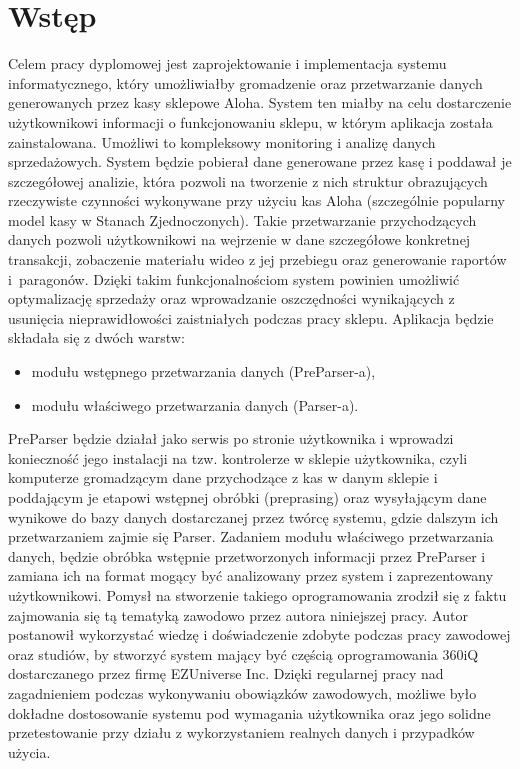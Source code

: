 \documentclass[a4paper]{book}
\author{Mateusz Stolecki}
\begin{document}

\cleardoublepage

	



\mainmatter
\chapter{Wstęp}
\label{rozdzial1}
Celem pracy dyplomowej jest zaprojektowanie i implementacja systemu informatycznego, który umożliwiałby gromadzenie oraz przetwarzanie danych generowanych przez kasy sklepowe Aloha. System ten miałby na  celu dostarczenie użytkownikowi informacji o funkcjonowaniu sklepu, w którym aplikacja została zainstalowana. Umożliwi to kompleksowy monitoring i analizę danych sprzedażowych. System będzie pobierał dane generowane przez kasę i poddawał je szczegółowej analizie, która pozwoli na tworzenie z nich struktur  obrazujących rzeczywiste czynności wykonywane przy użyciu kas Aloha (szczególnie popularny model kasy w Stanach Zjednoczonych). Takie przetwarzanie przychodzących danych pozwoli użytkownikowi na wejrzenie w dane szczegółowe konkretnej transakcji, zobaczenie materiału wideo z jej przebiegu oraz generowanie raportów i~paragonów. Dzięki takim funkcjonalnościom system powinien umożliwić optymalizację sprzedaży oraz wprowadzanie oszczędności wynikających z usunięcia nieprawidłowości zaistniałych podczas pracy sklepu. Aplikacja będzie składała się z dwóch warstw:
\begin{itemize}
	\item modułu wstępnego przetwarzania danych (PreParser-a),
	\item modułu właściwego przetwarzania danych (Parser-a).
\end{itemize}
PreParser będzie działał jako serwis po stronie użytkownika i wprowadzi konieczność jego instalacji na tzw. kontrolerze w sklepie użytkownika, czyli komputerze gromadzącym dane przychodzące z kas w danym sklepie i poddającym je etapowi wstępnej obróbki (preprasing) oraz wysyłającym dane wynikowe do bazy danych dostarczanej przez twórcę systemu, gdzie dalszym ich przetwarzaniem zajmie się Parser. Zadaniem modułu właściwego przetwarzania danych, będzie obróbka wstępnie przetworzonych informacji przez PreParser i zamiana ich na format mogący być analizowany przez system i zaprezentowany użytkownikowi. Pomysł na stworzenie takiego oprogramowania zrodził się z faktu zajmowania się tą tematyką zawodowo przez autora niniejszej pracy. Autor postanowił wykorzystać wiedzę i doświadczenie zdobyte podczas pracy zawodowej oraz studiów, by stworzyć system mający być częścią oprogramowania 360iQ dostarczanego przez firmę EZUniverse Inc. Dzięki regularnej pracy nad zagadnieniem podczas wykonywaniu obowiązków zawodowych, możliwe było dokładne dostosowanie systemu pod wymagania użytkownika oraz jego solidne przetestowanie przy działu z wykorzystaniem realnych danych i przypadków użycia.
\end{document}
